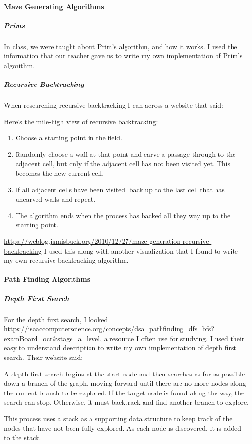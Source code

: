 \documentclass[titlepage]{article}
\begin{document}
\paragraph{Maze Generating Algorithms}
\subparagraph*{Prims}
In class, we were taught about Prim's algorithm, and how it works. I used the information that our teacher gave us to write my own implementation of Prim's algorithm.
\subparagraph*{Recursive Backtracking}
When researching recursive backtracking I can across a website that said:
\begin{quoting}
    Here's the mile-high view of recursive backtracking:
    \begin{enumerate}
        \item Choose a starting point in the field.
        \item Randomly choose a wall at that point and carve a passage through to the adjacent cell, but only if the adjacent cell has not been visited yet. This becomes the new current cell.
        \item If all adjacent cells have been visited, back up to the last cell that has uncarved walls and repeat.
        \item The algorithm ends when the process has backed all they way up to the starting point. 
    \end{enumerate}
\end{quoting}
\url{https://weblog.jamisbuck.org/2010/12/27/maze-generation-recursive-backtracking}
I used this along with another visualization that I found to write my own recursive backtracking algorithm.

\paragraph{Path Finding Algorithms}
\subparagraph*{Depth First Search}
For the depth first search, I looked \url{https://isaaccomputerscience.org/concepts/dsa_pathfinding_dfs_bfs?examBoard=ocr&stage=a_level}, a resource I often use for studying. I used their easy to understand description to write my own implementation of depth first search. Their website said:
\begin{quoting}
    A depth-first search begins at the start node and then searches as far as possible down a branch of the graph, moving forward until there are no more nodes along the current branch to be explored. If the target node is found along the way, the search can stop. Otherwise, it must backtrack and find another branch to explore.

    This process uses a stack as a supporting data structure to keep track of the nodes that have not been fully explored. As each node is discovered, it is added to the stack.
\end{quoting}
\end{document}
